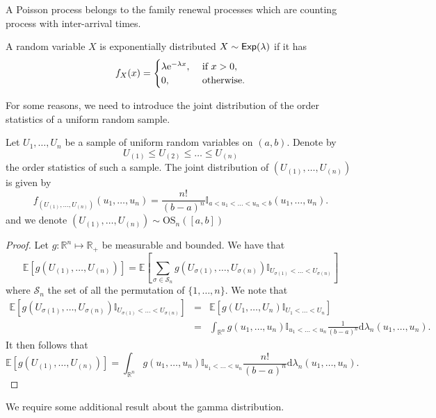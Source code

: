 \begin{remark}\label{def_renewal_process}
A Poisson process belongs to the family renewal processes which are counting process with \iid inter-arrival times.
\end{remark}
\begin{definition}\label{def:exp_dist}
A random variable $X$ is exponentially distributed $X\sim\mathsf{Exp}(\lambda)$ if it has \pdf
$$
f_X(x) =\begin{cases} 
\lambda\mathrm{e}^{-\lambda x},&\text{ if }x>0,\\
0,&\text{ otherwise}.
\end{cases}
$$
\end{definition}
For some reasons, we need to introduce the joint distribution of the order statistics of a uniform random sample.
\begin{prop}\label{def:uniform_OS_dist}
Let $U_1,\ldots, U_n$ be a sample of \iid uniform random variables on $(a,b)$. Denote by 
$$
U_{(1)}\leq U_{(2)}\leq\ldots\leq U_{(n)}
$$
the order statistics of such a sample. The joint distribution of $(U_{(1)},\ldots,  U_{(n)})$ is given by 
$$
f_{(U_{(1)},\ldots, U_{(n)})}(u_1,\ldots, u_n)=\frac{n!}{(b-a)^n}\mathbb{I}_{a<u_1<\ldots< u_n<b}(u_1,\ldots, u_n).
$$
and we denote $(U_{(1)},\ldots,  U_{(n)})\sim \text{OS}_n([a,b])$
\end{prop}
\begin{proof}
Let $g:\mathbb{R}^n\mapsto \mathbb{R}_+$ be measurable and bounded. We have that
$$
\mathbb{E}[g(U_{(1)},\ldots,U_{(n)})]=\mathbb{E}\left[\sum_{\sigma\in\mathcal{S}_n}
g(U_{\sigma(1)},\ldots,U_{\sigma(n)})
\mathbb{I}_{U_{\sigma(1)} <\ldots< U_{\sigma(n)}}
\right]
$$
where $\mathcal{S}_n$ the set of all the permutation of $\{1,\ldots,n \}$. We note that
\begin{eqnarray*}
\mathbb{E}\left[g(U_{\sigma(1)},\ldots,U_{\sigma(n)})
\mathbb{I}_{U_{\sigma(1)} <\ldots< U_{\sigma(n)}}
\right]&=& \mathbb{E}\left[g(U_{1},\ldots,U_{n})
\mathbb{I}_{U_{1} <\ldots< U_{n}}\right]\\
&=&\int_{\mathbb{R}^{n}}g(u_{1},\ldots,u_{n})
\mathbb{I}_{u_{1} <\ldots< u_{n}}\frac{1}{(b-a)^n}\text{d}\lambda_{n}(u_1,\ldots, u_n).
\end{eqnarray*}
It then follows that
$$
\mathbb{E}[g(U_{(1)},\ldots,U_{(n)})]=\int_{\mathbb{R}^{n}}g(u_{1},\ldots,u_{n})
\mathbb{I}_{u_{1} <\ldots< u_{n}}\frac{n!}{(b-a)^n}\text{d}\lambda_{n}(u_1,\ldots, u_n).
$$
\end{proof}
We require some additional result about the gamma distribution.
